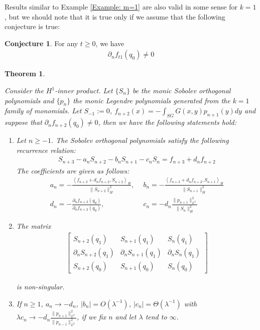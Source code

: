 \documentclass[12pt]{amsart}
\theoremstyle{plain}
\newtheorem{theorem}{Theorem}[section]
\theoremstyle{definition}
\newtheorem{conjecture}{Conjecture}[section]
\newcommand{\inner}[2]{\left \langle #1, #2\right \rangle}
\begin{document}
Results similar to Example \ref{Example: m=1} are also valid in some sense for $k=1$, but we should note that it is true only if we assume that the following conjecture is true:
\begin{conjecture}\label{conjecture:normal} For any $t\geq 0$, we have
\begin{align}
    \partial_n f_{t1}(q_0)\neq 0 \label{equation: normal derivative conjecture}
\end{align}

\end{conjecture}
\begin{theorem}\label{Recurrence Relation with one assumption $(k=1)$}


Consider the $H^1$-inner product. Let $\{S_n\}$ be the monic Sobolev orthogonal polynomials and $\{p_n\}$ the monic Legendre polynomials generated from the $k = 1$ family of monomials. Let $S_{-1}:=0$, $f_{n+2}(x) = -\int_{SG}G(x,y)p_{n+1}(y)dy$ and suppose that $\partial_n f_{n+2}(q_0)\neq 0$, then we have the following statements hold: 

\begin{enumerate}
    \item Let $n\geq-1$. The Sobolev orthogonal polynomials satisfy the following recurrence relation:
    \begin{align}
    S_{n+3}-a_nS_{n+2} - b_nS_{n+1}-c_nS_n = f_{n+3}+d_nf_{n+2} \label{recurrencek=1}
    \end{align}
    The coefficients are given as follows:
    \medskip
    \begin{align}
    a_n=-\frac{\inner{f_{n+3}+d_nf_{n+2}}{S_{n+2}}_H}{\|S_{n+2}\|_H^2},\:&\:b_n= -\frac{\inner{f_{n+3}+d_nf_{n+2}}{S_{n+1}}_H}{\|S_{n+1}\|_H^2} \label{a_n and b_n in k=1 recurrence} \\
   d_n=-\frac{\partial_n f_{n+3}(q_0)}{\partial_nf_{n+2}(q_0)},\:&\:c_n=-d_n\frac{\|p_{n+1}\|_{L^2}^2}{\|S_n\|_H^2}\label{d_n and c_n in k=1 recurrence}
  \end{align}

    \item The matrix
    \begin{align}
        \begin{bmatrix}
    S_{n+2}(q_1)&S_{n+1}(q_1)&S_{n}(q_1)\\
    \partial_n S_{n+2}(q_1) &\partial_n S_{n+1}(q_1)&\partial_n S_{n}(q_1)\\
    S_{n+2}(q_0)&S_{n+1}(q_0)&S_{n}(q_0)
    \end{bmatrix} \label{Matrix for k=1 recurrence}
    \end{align}
    
    is non-singular.
    
    \item If $n\ge1$, $a_n\rightarrow -d_n$, $|b_n|=O(\lambda^{-1})$, $|c_n|=\Theta(\lambda^{-1})$ with $\lambda c_n\rightarrow -d_n\frac{\|p_{n+1}\|_{L^2}^2}{\|p_{n-1}\|_{L^2}^2}$, if we fix $n$ and let $\lambda$ tend to $\infty$.
\end{enumerate}

\end{theorem}
\end{document}
